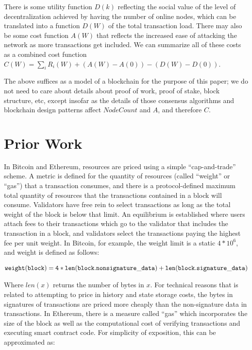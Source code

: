 \documentclass[12pt, final]{article}
\begin{document}
There is some utility function $D(k)$ reflecting the social value of the level of decentralization achieved by having the number of online nodes, which can be translated into a function $D(W)$ of the total transaction load. There may also be some cost function $A(W)$ that reflects the increased ease of attacking the network as more transactions get included. We can summarize all of these costs as a combined cost function $C(W) = \sum_i R_i(W) + (A(W) - A(0)) - (D(W) - D(0))$.

The above suffices as a model of a blockchain for the purpose of this paper; we do not need to care about details about proof of work, proof of stake, block structure, etc, except insofar as the details of those consensus algorithms and blockchain design patterns affect $NodeCount$ and $A$, and therefore $C$.

\section{Prior Work}

In Bitcoin and Ethereum, resources are priced using a simple ``cap-and-trade'' scheme. A metric is defined for the quantity of resources (called ``weight'' or ``gas'') that a transaction consumes, and there is a protocol-defined maximum total quantity of resources that the transactions contained in a block will consume. Validators have free rein to select transactions as long as the total weight of the block is below that limit. An equilibrium is established where users attach fees to their transactions which go to the validator that includes the transaction in a block, and validators select the transactions paying the highest fee per unit weight. In Bitcoin, for example, the weight limit is a static $4 *10^6$, and weight is defined as follows\cite{weightunits}:

\begin{scriptsize}
\begin{equation}
\tt{weight(block) = 4 * len(block.nonsignature\_data) + len(block.signature\_data)}
\end{equation}
\end{scriptsize}

Where $len(x)$ returns the number of bytes in $x$. For technical reasons that is related to attempting to price in history and state storage costs, the bytes in signatures of transactions are priced more cheaply than the non-signature data in transactions. In Ethereum, there is a measure called ``gas'' which incorporates the size of the block as well as the computational cost of verifying transactions and executing smart contract code. For simplicity of exposition, this can be approximated as:
\end{document}
